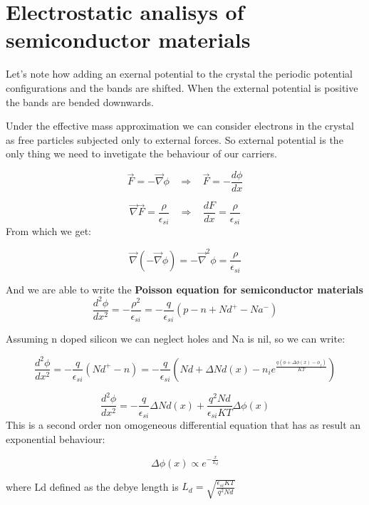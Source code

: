 \chapter{Electrostatic analisys of semiconductor materials} %
\label{cha:electrostatic_analisys}

Let's note how adding an exernal potential to the crystal the periodic potential configurations and the bands are shifted.
When the external potential is positive the bands are bended downwards.

Under the effective mass approximation we can consider electrons in the crystal as free particles subjected only to external forces.
So external potential is the only thing we need to invetigate the behaviour of our carriers.

\begin{equation}
 	\vec{F}=-\vec{\nabla} \phi  \ \ \ \  \Longrightarrow \ \ \ \  	\vec{F}=- \frac{d\phi}{dx}
 \end{equation} 

\begin{equation}
	\vec{\nabla}\vec{F}= \frac{\rho}{\epsilon_{si}} \ \ \ \  \Longrightarrow \ \ \ \ \frac{dF}{dx}=\frac{\rho}{\epsilon_{si}}
\end{equation}
From which we get:

\begin{equation}
	\vec{\nabla}(-\vec{\nabla}\phi)= -\vec{\nabla}^2\phi=\frac{\rho}{\epsilon_{si}}
\end{equation}

And we are able to write the \textbf{Poisson equation for semiconductor materials}
\begin{equation}
	\frac{d^2\phi}{dx^2}=-\frac{\rho^2}{\epsilon_{si}}=-\frac{q}{\epsilon_{si}}(p-n+Nd^+-Na^-)
\end{equation}

Assuming n doped silicon we can neglect holes and Na is nil, so we can write:


\begin{equation}
	\frac{d^2\phi}{dx^2}=-\frac{q}{\epsilon_{si}}(Nd^+-n)= -\frac{q}{\epsilon_{si}}(Nd + \Delta Nd(x)-n_ie^{\frac{q(\phi+\Delta \phi(x) -\phi_f)}{KT}})
\end{equation}

\begin{equation}
	\frac{d^2\phi}{dx^2}=-\frac{q}{\epsilon_{si}}\Delta Nd(x)+\frac{q^2Nd}{\epsilon_{si}KT}\Delta\phi(x)
\end{equation}
 This is a second order non omogeneous differential equation that has as result an exponential behaviour:

 \begin{equation}
 	\Delta \phi(x) \propto e^{-\frac{x}{L_d}}
 \end{equation}

 where Ld defined as the debye length is $L_d= \sqrt{\frac{\epsilon_{si}KT}{q^2Nd}}$

 
